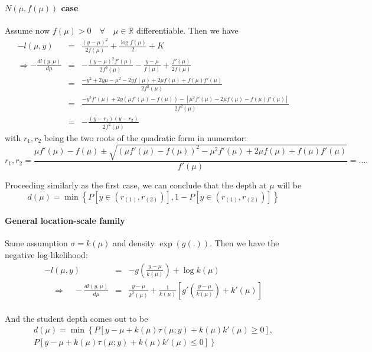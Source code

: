 \documentclass[10pt]{article}
\begin{document}
\paragraph{$N(\mu,f(\mu))$ case} Assume now $f(\mu)>0\quad\forall\quad \mu\in\mathbb{R}$ differentiable. Then we have
\begin{eqnarray*}
-l(\mu,y) &=& \frac{(y-\mu)^2}{2f(\mu)} + \frac{\log f(\mu)}{2} + K\\
\Rightarrow -\frac{dl(y,\mu)}{d\mu} &=& -\frac{(y-\mu)^2f'(\mu)}{2f^2(\mu)} -\frac{y-\mu}{f(\mu)} + \frac{f'(\mu)}{2f(\mu)}\\
&=& \frac{-y^2+2y\mu-\mu^2-2yf(\mu)+2\mu f(\mu)+f(\mu)f'(\mu)}{2f^2(\mu)}\\
&=& \frac{-y^2f'(\mu) + 2y(\mu f'(\mu)-f(\mu)) - [\mu^2f'(\mu)-2\mu f(\mu)-f(\mu)f'(\mu)]}{2f^2(\mu)}\\
&=& -\frac{(y-r_1)(y-r_2)}{2f^2(\mu)}
\end{eqnarray*}
with $r_1, r_2$ being the two roots of the quadratic form in numerator:
$$ r_1,r_2 = \frac{\mu f'(\mu)-f(\mu)\pm\sqrt{(\mu f'(\mu)-f(\mu))^2-\mu^2f'(\mu)+2\mu f(\mu)+f(\mu)f'(\mu)}}{f'(\mu)} = ....$$

Proceeding similarly as the first case, we can conclude that the depth at $\mu$ will be
$$ d(\mu) = \min\left\lbrace P\left[y\in(r_{(1)},r_{(2)})\right], 1-P\left[y\in(r_{(1)},r_{(2)})\right] \right\rbrace $$

\paragraph{General location-scale family} Same assumption $\sigma = k(\mu)$ and density $\exp(g(.))$. Then we have the negative log-likelihood:
\begin{eqnarray*}
-l(\mu,y) &=& -g\left(\frac{y-\mu}{k(\mu)}\right) + \log k(\mu)\\
\quad\Rightarrow\quad -\frac{dl(y,\mu)}{d\mu}  &=& \frac{y-\mu}{k^2(\mu)}+\frac{1}{k(\mu)}\left[g'\left(\frac{y-\mu}{k(\mu)}\right)+ k'(\mu)\right]\\
\end{eqnarray*}

And the student depth comes out to be
\begin{align*}
d(\mu) = \min\left\lbrace P[y-\mu+k(\mu)\tau(\mu;y)+k(\mu)k'(\mu) \geq 0], \right.\nonumber\\
\left. P[y-\mu+k(\mu)\tau(\mu;y)+k(\mu)k'(\mu) \leq 0] \right\rbrace
\end{align*}
\end{document}

